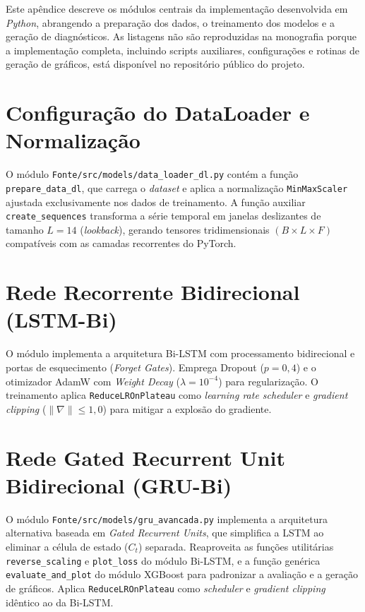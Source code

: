 Este apêndice descreve os módulos centrais da implementação desenvolvida em \textit{Python}, abrangendo a preparação dos dados, o treinamento dos modelos e a geração de diagnósticos. As listagens não são reproduzidas na monografia porque a implementação completa, incluindo scripts auxiliares, configurações e rotinas de geração de gráficos, está disponível no repositório público do projeto.

\section{Configuração do DataLoader e Normalização}
O módulo \texttt{Fonte/src/models/data\_loader\_dl.py} contém a função \texttt{prepare\_data\_dl}, que carrega o \textit{dataset} e aplica a normalização \texttt{MinMaxScaler} ajustada exclusivamente nos dados de treinamento. A função auxiliar \texttt{create\_sequences} transforma a série temporal em janelas deslizantes de tamanho $L = 14$ (\textit{lookback}), gerando tensores tridimensionais $(B \times L \times F)$ compatíveis com as camadas recorrentes do PyTorch.

\section{Rede Recorrente Bidirecional (LSTM-Bi)}
O módulo  implementa a arquitetura Bi-LSTM com processamento bidirecional e portas de esquecimento (\textit{Forget Gates}). Emprega Dropout ($p = 0{,}4$) e o otimizador AdamW com \textit{Weight Decay} ($\lambda = 10^{-4}$) para regularização. O treinamento aplica \texttt{ReduceLROnPlateau} como \textit{learning rate scheduler} e \textit{gradient clipping} ($\|\nabla\| \leq 1{,}0$) para mitigar a explosão do gradiente.

\section{Rede Gated Recurrent Unit Bidirecional (GRU-Bi)}
O módulo \texttt{Fonte/src/models/gru\_avancada.py} implementa a arquitetura alternativa baseada em \textit{Gated Recurrent Units}, que simplifica a LSTM ao eliminar a célula de estado ($C_t$) separada. Reaproveita as funções utilitárias \texttt{reverse\_\-scaling} e \texttt{plot\_loss} do módulo Bi-LSTM, e a função genérica \texttt{evaluate\_\-and\_\-plot} do módulo XGBoost para padronizar a avaliação e a geração de gráficos. Aplica \texttt{Reduce\-LR\-On\-Plateau} como \textit{scheduler} e \textit{gradient clipping} idêntico ao da Bi-LSTM.

